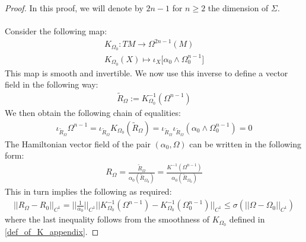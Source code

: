 \documentclass[11pt]{amsart}
\theoremstyle{plain}
\theoremstyle{definition}
\theoremstyle{remark}
\begin{document}
\begin{proof}
In this proof, we will denote by $2n-1$ for $n\geq 2$ the dimension of $\Sigma$.\\
\\
Consider the following map:
\begin{align}\label{def_of_K_appendix}
    K_{\Omega_0}: TM \rightarrow \Omega^{2n-1}(M) \\\nonumber 
    K_{\Omega_0}(X) \mapsto \iota_X \big[\alpha_0  \wedge \Omega_0^{n-1} \big]
\end{align}
This map is smooth and invertible. We now use this inverse to define a vector field in the following way:
\begin{align*}
    \tilde{R}_{\Omega}:= K^{-1}_{\Omega_0}(\Omega^{n-1})
\end{align*}
We then obtain the following chain of equalities:
\begin{align*}
    \iota_{ \tilde{R}_{\Omega}} \Omega^{n-1} =  \iota_{ \tilde{R}_{\Omega}} K_{\Omega_0} (\tilde{R}_{\Omega}) = 
    \iota_{ \tilde{R}_{\Omega}}  \iota_{ \tilde{R}_{\Omega}} (\alpha_0 \wedge \Omega_0^{n-1}) =0
\end{align*}
The Hamiltonian vector field of the pair $(\alpha_0, \Omega)$ can be written in the following form:
\begin{align*}
    R_{\Omega} = \frac{\tilde{R}_{\Omega}}{\alpha_0(\tilde{R}_{\Omega_0})}  = \frac{K^{-1}(\Omega^{n-1})}{\alpha_0(\tilde{R}_{\Omega_0})}
\end{align*}
This in turn implies the following as required:
\begin{align*}
    \vert\vert R_{\Omega} - R_0\vert\vert_{C^1} = \Big|\Big|\frac{1}{\alpha_0}\Big|\Big|_{C^1} \vert\vert K^{-1}_{\Omega_0}(\Omega^{n-1}) - K^{-1}_{\Omega_0}(\Omega_0^{n-1})\vert\vert_{C^1} \leq \sigma(\vert\vert\Omega - \Omega_0\vert\vert_{C^{1}})
\end{align*}
where the last inequality follows from the smoothness of $K_{\Omega_0}$ defined in \eqref{def_of_K_appendix}.
\end{proof}



\end{document}
